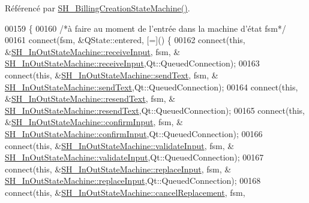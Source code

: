 Référencé par \hyperlink{classSimpleHotel_1_1SH__BillingCreationStateMachine_a8c7d39e11d0ced1fd9c27a5550465b86}{S\-H\-\_\-\-Billing\-Creation\-State\-Machine()}.


\begin{DoxyCode}
00159 \{
00160     \textcolor{comment}{/*à faire au moment de l'entrée dans la machine d'état fsm*/}
00161     connect(fsm, &QState::entered, [=]() \{
00162         connect(\textcolor{keyword}{this}, &\hyperlink{classSimpleHotel_1_1SH__InOutStateMachine_a17482446bbf0327e84feb5d6a1a612f0}{SH\_InOutStateMachine::receiveInput}, fsm, &
      \hyperlink{classSimpleHotel_1_1SH__InOutStateMachine_a17482446bbf0327e84feb5d6a1a612f0}{SH\_InOutStateMachine::receiveInput},Qt::QueuedConnection);
00163         connect(\textcolor{keyword}{this}, &\hyperlink{classSimpleHotel_1_1SH__InOutStateMachine_ae81d4a51fcd3277ebfc11af978b74c0b}{SH\_InOutStateMachine::sendText}, fsm, &
      \hyperlink{classSimpleHotel_1_1SH__InOutStateMachine_ae81d4a51fcd3277ebfc11af978b74c0b}{SH\_InOutStateMachine::sendText},Qt::QueuedConnection);
00164         connect(\textcolor{keyword}{this}, &\hyperlink{classSimpleHotel_1_1SH__InOutStateMachine_a5db6f59d446182ab9f10e0ccb0399915}{SH\_InOutStateMachine::resendText}, fsm, &
      \hyperlink{classSimpleHotel_1_1SH__InOutStateMachine_a5db6f59d446182ab9f10e0ccb0399915}{SH\_InOutStateMachine::resendText},Qt::QueuedConnection);
00165         connect(\textcolor{keyword}{this}, &\hyperlink{classSimpleHotel_1_1SH__InOutStateMachine_a949cdb448f813f201b6ca827d1c860e9}{SH\_InOutStateMachine::confirmInput}, fsm, &
      \hyperlink{classSimpleHotel_1_1SH__InOutStateMachine_a949cdb448f813f201b6ca827d1c860e9}{SH\_InOutStateMachine::confirmInput},Qt::QueuedConnection);
00166         connect(\textcolor{keyword}{this}, &\hyperlink{classSimpleHotel_1_1SH__InOutStateMachine_a3754990c3f90bb7d59e5028d3d6504d8}{SH\_InOutStateMachine::validateInput}, fsm, &
      \hyperlink{classSimpleHotel_1_1SH__InOutStateMachine_a3754990c3f90bb7d59e5028d3d6504d8}{SH\_InOutStateMachine::validateInput},Qt::QueuedConnection);
00167         connect(\textcolor{keyword}{this}, &\hyperlink{classSimpleHotel_1_1SH__InOutStateMachine_a9117d781c5f8bc02d8b2eba359b0e85a}{SH\_InOutStateMachine::replaceInput}, fsm, &
      \hyperlink{classSimpleHotel_1_1SH__InOutStateMachine_a9117d781c5f8bc02d8b2eba359b0e85a}{SH\_InOutStateMachine::replaceInput},Qt::QueuedConnection);
00168         connect(\textcolor{keyword}{this}, &\hyperlink{classSimpleHotel_1_1SH__InOutStateMachine_abd6f8321716ad2f9a5e9d17cdedca275}{SH\_InOutStateMachine::cancelReplacement}, fsm,

\end{DoxyCode}
